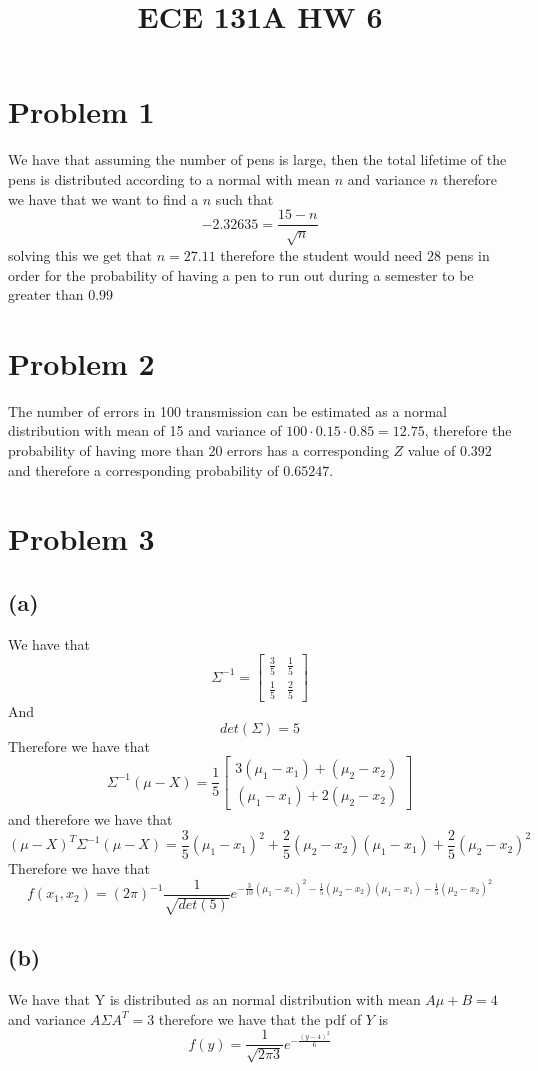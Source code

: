 
\title{ECE 131A HW 6}

\maketitle
\section*{Problem 1}
We have that assuming the number of pens is large, 
then the total lifetime of the pens is distributed according to
a normal with mean $n$ and variance $n$ therefore we have that we want
to find a $n$ such that 
$$-2.32635=\frac{15-n}{\sqrt{n}}$$
solving this we get that $n=27.11$ therefore the student would need
$\boxed{28}$ pens in order for the probability of having a pen 
to run out during a semester to be greater than $0.99$
\section*{Problem 2}
The number of errors in 100 transmission can be estimated
as a normal distribution with mean of 15 and variance of $100\cdot0.15\cdot0.85=12.75$,
therefore the probability of having more than 20 errors has a corresponding 
$Z$ value of $0.392$ and therefore a corresponding probability of
$\boxed{0.65247}$.
\section*{Problem 3}
\subsection*{(a)}
We have that 
$$\Sigma^{-1}=\begin{bmatrix}
\frac{3}{5}&\frac{1}{5}\\ \frac{1}{5}&\frac{2}{5}\end{bmatrix}$$
And 
$$det(\Sigma)=5$$
Therefore we have that 
$$\Sigma^{-1}(\mu-X)=\frac{1}{5}\begin{bmatrix}
    3(\mu_1-x_1)+(\mu_2-x_2)\\
    (\mu_1-x_1)+2(\mu_2-x_2)
\end{bmatrix}$$
and therefore we have that
$$(\mu-X)^T\Sigma^{-1}(\mu-X)=\frac{3}{5}(\mu_1-x_1)^2+\frac{2}{5}(\mu_2-x_2)(\mu_1-x_1)+\frac{2}{5}(\mu_2-x_2)^2$$
Therefore we have that
$$f(x_1,x_2)=(2\pi)^{-1}\frac{1}{\sqrt{det(5)}}e^{-\frac{3}{10}(\mu_1-x_1)^2-\frac{1}{5}(\mu_2-x_2)(\mu_1-x_1)-\frac{1}{5}(\mu_2-x_2)^2}$$
\subsection*{(b)}
We have that Y is distributed as an normal distribution with 
mean $A\mu+B=4$ and variance $A\Sigma A^T=3$ therefore we have that
the pdf of $Y$ is 
$$f(y)=\frac{1}{\sqrt{2\pi3}}e^{-\frac{(y-4)^2}{6}}$$
